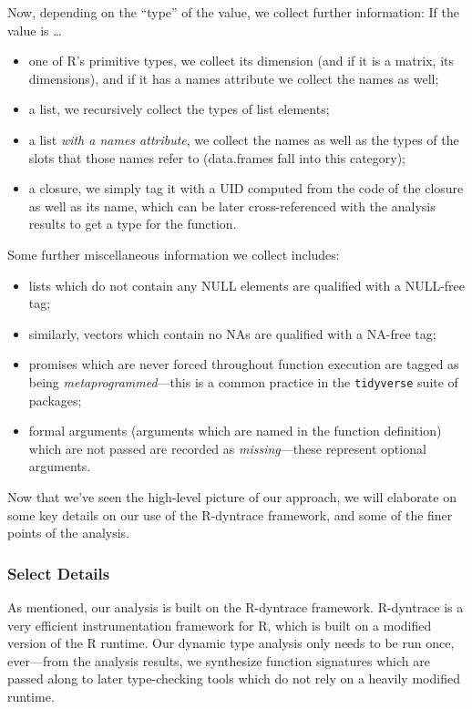 \documentclass[acmsmall,review,anonymous]{acmart}\settopmatter{printfolios=true,printccs=false,printacmref=false}
\begin{document}
Now, depending on the ``type'' of the value, we collect further information:
If the value is \ldots

\begin{itemize}
\item one of R's primitive types, we collect its dimension (and if it is a matrix, its dimensions), and if it has a names attribute we collect the names as well;
\item a list, we recursively collect the types of list elements;
\item a list {\it with a names attribute}, we collect the names as well as the types of the slots that those names refer to (data.frames fall into this category);
\item a closure, we simply tag it with a UID computed from the code of the closure as well as its name, which can be later cross-referenced with the analysis results to get a type for the function.
\end{itemize}

Some further miscellaneous information we collect includes:

\begin{itemize}
\item lists which do not contain any NULL elements are qualified with a NULL-free tag; 
\item similarly, vectors which contain no NAs are qualified with a NA-free tag;
\item promises which are never forced throughout function execution are tagged as being {\it metaprogrammed}---this is a common practice in the {\tt tidyverse} suite of packages;
\item formal arguments (arguments which are named in the function definition) which are not passed are recorded as {\it missing}---these represent optional arguments.
\end{itemize}

Now that we've seen the high-level picture of our approach, we will elaborate on some key details on our use of the R-dyntrace framework, and some of the finer points of the analysis.

%
%
\subsubsection{Select Details}

As mentioned, our analysis is built on the R-dyntrace framework.
R-dyntrace is a very efficient instrumentation framework for R, which is built on a modified version of the R runtime.
Our dynamic type analysis only needs to be run once, ever---from the analysis results, we synthesize function signatures which are passed along to later type-checking tools which do not rely on a heavily modified runtime. 
\end{document}
